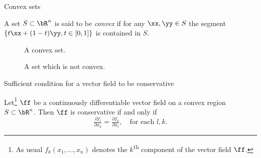     {Convex sets}


    \begin{definition}
        A set \(S\subset \bR^n\) is said to be \emph{convex} if for any \(\xx,\yy\in S\) the segment \(\{t\xx + (1-t)\yy, t\in[0,1]\}\) is contained in \(S\).
    \end{definition}

    
        
            \begin{figure}
                \caption{A convex set.}
            \end{figure}
                
        
            \begin{figure}
                \caption{A set which is not convex.}
            \end{figure}
        
    





    {Sufficient condition for a vector field to be conservative}


    \begin{theorem}
        Let\footnote{As usual  \(  f_k(x_1,\ldots,x_n)\) denotes the \(k\)\textsuperscript{th} component of the vector field \(\ff\).} \(\ff\) be a continuously differentiable vector field on a convex region \(S\subset \bR^n\). 
        Then \(\ff\) is conservative if and only if
        \[
            \tfrac{\partial f_l}{\partial x_k} = \tfrac{\partial f_k}{\partial x_l},
            \quad \text{for each \(l,k\)}.
        \]
    \end{theorem}

